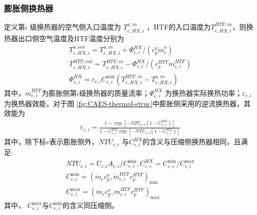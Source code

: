 \subsubsection{膨胀侧换热器}
定义第$i$ 级换热器的空气侧入口温度为 $T_{e,HX,i}^{a,in}$ ，HTF的入口温度为$T_{e,HX,i}^{HTF,in}$，则换热器出口侧空气温度及HTF温度分别为
\begin{subequations}
\label{eq:he-turb-temp-out}
\begin{gather}
T_{e,HX,i}^{a,out} = T_{e,HX,i}^{a,in} + \Phi _{e,i}^{HX}/({c_p^a\dot m_e^a})\label{equ:he-turb-temp-air-out}\\
T_{e,HX,i}^{HTF,out} = T_{e,HX,i}^{HTF,in} - \Phi _{e,i}^{HX}/({c_p^{HTF}\dot m_{e,i}^{HTF}}) \label{equ:he-turb-temp-HTF-out}\\
\Phi _{e,i}^{HX} = {\varepsilon _{e,i}}C_{e,i}^{\min }({T_{e,HX,i}^{HTF,in} - T_{e,HX,i}^{a,in}})\label{equ:he-turb-thermal}
\end{gather}
\end{subequations}
其中，$\dot m_{e,i}^{HTF}$为膨胀侧第$i$级换热器的质量流率；$\Phi _{e,i}^{HX}$ 为换热器实际换热功率；${\varepsilon _{e,i}}$ 为换热器效能，对于图
\ref{fig:CAES-thermal-struc}中膨胀侧采用的逆流换热器，其效能为\cite{Heat-mass-transfer-11}
\begin{subequations}
\begin{gather}
{\varepsilon _{e,i}} = \frac{{1 - \exp [{- NT{U_{e,i}}({1 - C_{e,i}^{HX}})}]}}{{1 - C_{e,i}^{HX}\exp [{- NT{U_{e,i}}({1 - C_{e,i}^{HX}})}]}}\label{equ:he-eff-1}
\end{gather}
\end{subequations}
其中，除下标$e$表示膨胀侧外，$NT{U_{e,i}}$ 与$C_{e,i}^{HX}$的含义与压缩侧换热器相同，且满足:
\begin{subequations}
\begin{gather}
NT{U_{e,i}} = U_{e,i}A_{e,i}/C_{e,i}^{\min }, C_{e,i}^{HX} = C_{e,i}^{\min }/C_{e,i}^{\max }\label{equ:he-turb-NTU-C}\\
C_{e,i}^{\min } = {({{{\dot m}_e}c_p^a,\dot m_{e,i}^{HTF}c_p^{HTF}})_{\min }}\label{equ:he-turb-Cmin}\\
C_{e,i}^{\max } = {({{{\dot m}_e}c_p^a,\dot m_{e,i}^{HTF}c_p^{HTF}})_{\max }}\label{equ:he-turb-Cmax}
\end{gather}
\end{subequations}
其中， $C_{e,i}^{\max }$与$C_{e,i}^{\min }$的含义同压缩侧。


